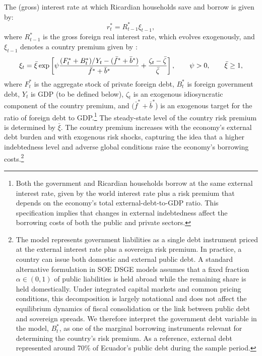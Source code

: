 \documentclass[12pt]{article}
\begin{document}
The (gross) interest rate at which Ricardian households save and borrow is given by:%
\begin{equation}
r_{t}^{\ast } =R_{t-1}^{\ast }\xi _{t-1}, \label{eq:interestrate}
\end{equation}
where $R_{t-1}^{\ast }$ is the gross foreign real interest rate, which evolves exogenously, and $\xi _{t-1}$ denotes a country premium given by \citep[see][]{schmitt2003closing, Adolfson2008evaluating}:
\begin{equation}
\label{eq:country_premium}
\xi _{t}=\bar{\xi}\exp \left[ \psi \frac{(F^{\ast}_t +B_{t}^{\ast})/Y_{t}-(\bar{f}^{\ast} + \bar{b}^{\ast})}{\bar{f}^{\ast} + \bar{b}^{\ast}}+\frac{\zeta _{t}-\bar{\zeta} }{%
\bar{\zeta} }\right] ,\qquad \psi >0,\qquad \bar{\xi}\geq 1,
\end{equation}%
where $F^{\ast}_t$ is the aggregate stock of private foreign debt, $B_t^*$ is foreign government debt, $Y_t$ is GDP (to be defined below), $\zeta _{t}$ is an exogenous idiosyncratic component of the country premium, and $(\bar{f}^{\ast}+\bar{b}^{\ast}$) is an exogenous target for the ratio of foreign debt to GDP.\footnote{Both the government and Ricardian households borrow at the same external interest rate, given by the world interest rate plus a risk premium that depends on the economy’s total external-debt-to-GDP ratio. This specification implies that changes in external indebtedness affect the borrowing costs of both the public and private sectors.} The steady-state level of the country risk premium is determined by $\bar{\xi}$. The country premium increases with the economy’s external debt burden and with exogenous risk shocks, capturing the idea that a higher indebtedness level and adverse global conditions raise the economy's borrowing costs.\footnote{The model represents government liabilities as a single debt instrument priced at the external interest rate plus a sovereign risk premium. In practice, a country can issue both domestic and external public debt. A standard alternative formulation in SOE DSGE models assumes that a fixed fraction $\alpha \in (0,1)$ of public liabilities is held abroad while the remaining share is held domestically. Under integrated capital markets and common pricing conditions, this decomposition is largely notational and does not affect the equilibrium dynamics of fiscal consolidation or the link between public debt and sovereign spreads. We therefore interpret the government debt variable in the model, $B_t^*$, as one of the marginal borrowing instruments relevant for determining the country's risk premium. As a reference, external debt represented around 70\% of Ecuador’s public debt during the sample period.}
\end{document}
